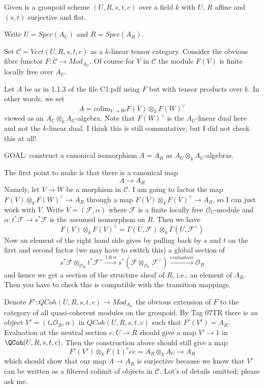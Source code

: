 \medskip\noindent
Given is a groupoid scheme $(U, R, s, t, c)$ over a field $k$ with
$U$, $R$ affine and $(s, t)$ surjective and flat.

\medskip\noindent
Write $U = Spec(A_U)$ and $R = Spec(A_R)$.

\medskip\noindent
Set $\mathcal{C} = Vect(U, R, s, t, c)$ as a $k$-linear tensor category.
Consider the obvious fibre functor $F : \mathcal{C} \to Mod_{A_U}$.
Of course for $V$ in $\mathcal{C}$ the module $F(V)$ is finite locally
free over $A_U$.

\medskip\noindent
Let $A$ be as in 1.1.3 of the file C1.pdf using $F$ but with tensor
products over $k$. In other words, we set
$$
A = \text{colim}_{V \to W} F(V) \otimes_k F(W)^\vee
$$
viewed as an $A_U \otimes_k A_U$-algebra. Note that $F(W)^\vee$ is the
$A_U$-linear dual here and not the $k$-linear dual. I think this is
still commutative, but I did not check this at all!

\medskip\noindent
GOAL: construct a canonical isomorphism $A = A_R$ as
$A_U \otimes_k A_U$-algebras.

\medskip\noindent
The first point to make is that there is a canonical map
$$
A \longrightarrow A_R
$$
Namely, let $V \to W$ be a morphism in $\mathcal{C}$.
I am going to factor the map $F(V) \otimes_k F(W)^\vee \to A_R$
through a map $F(V) \otimes_k F(V)^\vee \to A_R$, so I can just
work with $V$. Write $V = (\mathcal{F}, \alpha)$ where $\mathcal{F}$
is a finite locally free $\mathcal{O}_U$-module and
$\alpha : t^*\mathcal{F} \to s^*\mathcal{F}$ is the assumed
isomorphsm on $R$. Then we have
$$
F(V) \otimes_k F(V)^\vee =
\Gamma(U, \mathcal{F}) \otimes_k \Gamma(U, \mathcal{F}^\vee)
$$
Now an element of the right hand side gives by pulling back
by $s$ and $t$ on the first and second factor
(we may have to switch this) a global section of
$$
s^*\mathcal{F} \otimes_{\mathcal{O}_R} t^*\mathcal{F}^\vee
\xrightarrow{1 \otimes \alpha}
s^*(\mathcal{F} \otimes_{\mathcal{O}_U} \mathcal{F}^\vee)
\xrightarrow{evaluation}
\mathcal{O}_R
$$
and hence we get a section of the structure sheaf of $R$, i.e.,
an element of $A_R$. Then you have to check this is compatible
with the transition mappings.

\medskip\noindent
Denote $F' : QCoh(U, R, s, t, c) \to Mod_{A_U}$ the obvious
extension of $F$ to the category of all quasi-coherent modules
on the groupoid. By Tag 07TR there is an object
$V' = (t_*\mathcal{O}_R, \alpha)$ in $QCoh(U, R, s, t, c)$
such that $F'(V') = A_R$. Evaluation at the neutral section
$e : U \to R$ should give a map $V' \to 1$ in $\QCoh(U, R, s, t, c)$.
Then the construction above should still give a map
$$
F'(V') \otimes_k F(1)^vee = A_R \otimes_k A_U \longrightarrow A_R
$$
which should show that our map $A \to A_R$ is surjective because
we know that $V'$ can be written as a filtered colimit of objects
in $\mathcal{C}$. Lot's of details omitted; please ask me.

